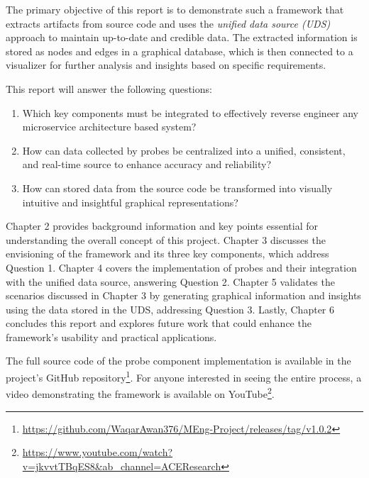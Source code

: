 The primary objective of this report is to demonstrate such a framework that extracts artifacts from source code and uses the \textit{unified data source (UDS)} approach to maintain up-to-date and credible data. The extracted information is stored as nodes and edges in a graphical database, which is then connected to a visualizer for further analysis and insights based on specific requirements.

This report will answer the following questions:
\begin{enumerate}
    \item Which key components must be integrated to effectively reverse engineer any microservice architecture based system?
    \item How can data collected by probes be centralized into a unified, consistent, and real-time source to enhance accuracy and reliability?
    \item How can stored data from the source code be transformed into visually intuitive and insightful graphical representations?
\end{enumerate}

Chapter 2 provides background information and key points essential for understanding the overall concept of this project. Chapter 3 discusses the envisioning of the framework and its three key components, which address Question 1. Chapter 4 covers the implementation of probes and their integration with the unified data source, answering Question 2. Chapter 5 validates the scenarios discussed in Chapter 3 by generating graphical information and insights using the data stored in the UDS, addressing Question 3. Lastly, Chapter 6 concludes this report and explores future work that could enhance the framework's usability and practical applications.

The full source code of the probe component implementation is available in the project's GitHub repository\footnote{\url{https://github.com/WaqarAwan376/MEng-Project/releases/tag/v1.0.2}}. For anyone interested in seeing the entire process, a video demonstrating the framework is available on YouTube\footnote{\url{https://www.youtube.com/watch?v=jkvvtTBqES8&ab_channel=ACEResearch}}.